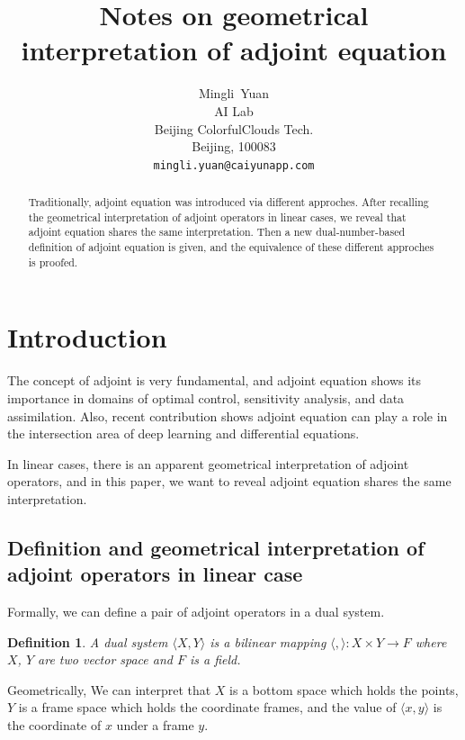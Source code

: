 \documentclass{article}
\title{Notes on geometrical interpretation of adjoint equation}
\author{
  Mingli~Yuan \\
  AI Lab \\
  Beijing ColorfulClouds Tech.\\
  Beijing, 100083 \\
  \texttt{mingli.yuan@caiyunapp.com} \\
}
\newtheorem{definition}{Definition}
\begin{document}
\maketitle

\begin{abstract}
Traditionally, adjoint equation was introduced via different approches.
After recalling the geometrical interpretation of adjoint operators in linear cases, we reveal that adjoint equation shares the same interpretation.
Then a new dual-number-based definition of adjoint equation is given, and the equivalence of these different approches is proofed.
\end{abstract}


\section{Introduction}

The concept of adjoint is very fundamental\cite{Daz1953MethodsOM}\cite{Marchuk1995}, and adjoint equation shows its importance in domains of optimal control\cite{Liberzon2012CalculusOV}, sensitivity analysis\cite{hall1983physical}, and data assimilation\cite{Errico1997WhatIA}. Also, recent contribution\cite{Chen2018NeuralOD} shows adjoint equation can play a role in the intersection area of deep learning and differential equations.

In linear cases, there is an apparent geometrical interpretation of adjoint operators, and in this paper, we want to reveal adjoint equation shares the same interpretation.

\subsection{Definition and geometrical interpretation of adjoint operators in linear case}

Formally, we can define a pair of adjoint operators in a dual system.

\begin{definition}
\label{d0}
A dual system $ \langle X, Y \rangle $ is a bilinear mapping $ \langle , \rangle : X \times Y \to F $ where $X$, $Y$ are two vector space and $ F $ is a field.
\end{definition}

Geometrically, We can interpret that $ X $ is a bottom space which holds the points, $ Y $ is a frame space which holds the coordinate frames, and the value of $ \langle x, y \rangle $ is the coordinate of $x$ under a frame $y$.
\end{document}
